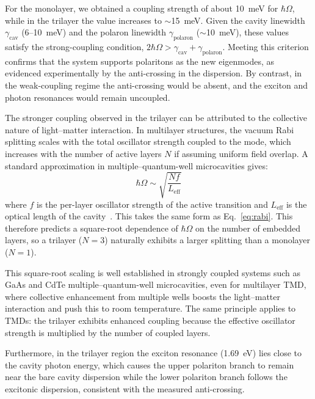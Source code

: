 For the monolayer, we obtained a coupling strength of about 10~meV for $\hbar\Omega$, while in the trilayer the value increases to $\sim$15~meV.
Given the cavity linewidth $\gamma_{\mathrm{cav}}$ (6--10~meV) and the polaron linewidth $\gamma_{\mathrm{polaron}}$ ($\sim$10~meV), these values satisfy the strong-coupling condition, $2\hbar\Omega > \gamma_{\mathrm{cav}} + \gamma_{\mathrm{polaron}}$.
Meeting this criterion confirms that the system supports polaritons as the new eigenmodes, as evidenced experimentally by the anti-crossing in the dispersion.
By contrast, in the weak-coupling regime the anti-crossing would be absent, and the exciton and photon resonances would remain uncoupled.

The stronger coupling observed in the trilayer can be attributed to the collective nature of light–matter interaction.
In multilayer structures, the vacuum Rabi splitting scales with the total oscillator strength coupled to the mode, which increases with the number of active layers $N$ if assuming uniform field overlap.
A standard approximation in multiple–quantum-well microcavities gives\cite{Savona1995-vn}:
\begin{equation}
\hbar\Omega \sim \sqrt{\frac{N f}{L_{\mathrm{eff}}}}
\label{eq:Rabi_layers}
\end{equation}
where $f$ is the per-layer oscillator strength of the active transition and $L_{\mathrm{eff}}$ is the optical length of the cavity~\cite{Savona1995-vn}.
This takes the same form as Eq.~\eqref{eq:rabi}.
This therefore predicts a square-root dependence of $\hbar\Omega$ on the number of embedded layers, so a trilayer ($N=3$) naturally exhibits a larger splitting than a monolayer ($N=1$).

This square-root scaling is well established in strongly coupled systems such as GaAs and CdTe multiple–quantum-well microcavities\cite{Skolnick1998-pj}, even for multilayer TMD\cite{Zhao2023-ax,Dufferwiel2015-ro},  
where collective enhancement from multiple wells boosts the light–matter interaction and push this to room temperature.
The same principle applies to TMDs: the trilayer exhibits enhanced coupling because the effective oscillator strength is multiplied by the number of coupled layers.

Furthermore, in the trilayer region the exciton resonance (1.69~eV) lies close to the cavity photon energy, which causes the upper polariton branch to remain near the bare cavity dispersion while the lower polariton branch follows the excitonic dispersion, consistent with the measured anti-crossing.

